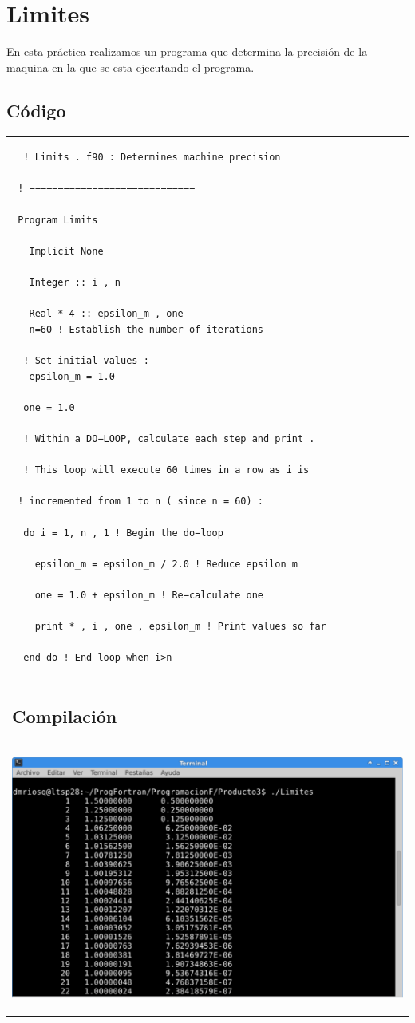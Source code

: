 \documentclass[10pt]{article}
\begin{document}
\section{Limites}
En esta práctica realizamos un programa que determina la precisión de la maquina en la que se esta ejecutando el programa.

\subsection{Código}
\begin{tabular}{l}
\begin{verbatim}  
  ! Limits . f90 : Determines machine precision

 ! −−−−−−−−−−−−−−−−−−−−−−−−−−−−−

 Program Limits

   Implicit None

   Integer :: i , n

   Real * 4 :: epsilon_m , one
   n=60 ! Establish the number of iterations

  ! Set initial values :
   epsilon_m = 1.0

  one = 1.0

  ! Within a DO−LOOP, calculate each step and print .

  ! This loop will execute 60 times in a row as i is

 ! incremented from 1 to n ( since n = 60) :

  do i = 1, n , 1 ! Begin the do−loop

    epsilon_m = epsilon_m / 2.0 ! Reduce epsilon m

    one = 1.0 + epsilon_m ! Re−calculate one

    print * , i , one , epsilon_m ! Print values so far

  end do ! End loop when i>n
\end{verbatim} \\
\subsection{Compilación}\\

\begin{center}
   \includegraphics[scale=0.4]{L}
\end{center}
\end{tabular}
\end{document}
